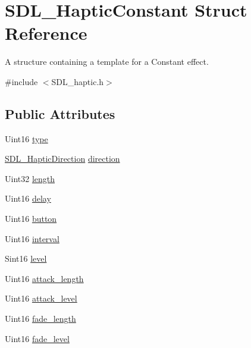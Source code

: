 \hypertarget{struct_s_d_l___haptic_constant}{}\section{S\+D\+L\+\_\+\+Haptic\+Constant Struct Reference}
\label{struct_s_d_l___haptic_constant}


A structure containing a template for a Constant effect.  




{\ttfamily \#include $<$S\+D\+L\+\_\+haptic.\+h$>$}

\subsection*{Public Attributes}
\begin{DoxyCompactItemize}
\item 
Uint16 \mbox{\hyperlink{struct_s_d_l___haptic_constant_a5cb31202803a8bc1be95fcede5ac8afb}{type}}
\item 
\mbox{\hyperlink{struct_s_d_l___haptic_direction}{S\+D\+L\+\_\+\+Haptic\+Direction}} \mbox{\hyperlink{struct_s_d_l___haptic_constant_a3e871debf4e57c35960f019d2605d84f}{direction}}
\item 
Uint32 \mbox{\hyperlink{struct_s_d_l___haptic_constant_aeb994c356b1d236b060f277d157e98ec}{length}}
\item 
Uint16 \mbox{\hyperlink{struct_s_d_l___haptic_constant_a16a751009893f5412201e3ce91146b25}{delay}}
\item 
Uint16 \mbox{\hyperlink{struct_s_d_l___haptic_constant_aa65321f1b002adaab6e629d5bed556e9}{button}}
\item 
Uint16 \mbox{\hyperlink{struct_s_d_l___haptic_constant_ab1f7f0df856f4cf1fdf937cb886226b4}{interval}}
\item 
Sint16 \mbox{\hyperlink{struct_s_d_l___haptic_constant_a5b095eea77464623ed57af15f29f4ca6}{level}}
\item 
Uint16 \mbox{\hyperlink{struct_s_d_l___haptic_constant_a907bade68ab53fb24e7d2651d19b767f}{attack\+\_\+length}}
\item 
Uint16 \mbox{\hyperlink{struct_s_d_l___haptic_constant_a0928a37f3fab0e5b7daffc7a1d65744c}{attack\+\_\+level}}
\item 
Uint16 \mbox{\hyperlink{struct_s_d_l___haptic_constant_a647a6b761ac6ba16160d0892a12806bc}{fade\+\_\+length}}
\item 
Uint16 \mbox{\hyperlink{struct_s_d_l___haptic_constant_a49f6499c89f3e494efbe92f12277c949}{fade\+\_\+level}}
\end{DoxyCompactItemize}


